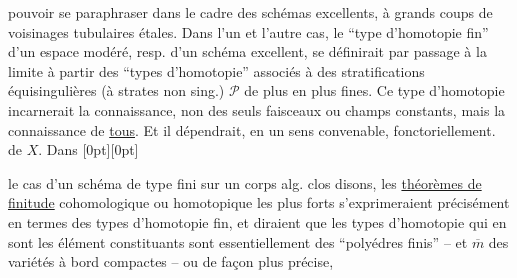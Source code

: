 %
pouvoir se paraphraser dans le cadre des schémas excellents, à grands coups de voisinages tubulaires étales. Dans l'un et l'autre cas, le ``type d'homotopie fin'' d'un espace modéré, resp. d'un schéma excellent, se définirait par passage à la limite à partir des ``types d'homotopie'' associés à des stratifications équisingulières (à strates non sing.) $\mathcal P$ de plus en plus fines. Ce type d'homotopie  incarnerait la connaissance, non des seuls faisceaux ou champs  constants, mais  la connaissance de \uline{tous}. Et il dépendrait, en un sens convenable,
fonctoriellement. de $X$. Dans%
\raisebox{0pt}[0pt][0pt]{\parbox{0pt}{}} le cas d'un schéma de type fini sur un corps alg. clos disons, les \uline{théorèmes de finitude} cohomologique ou homotopique les plus forts s'exprimeraient précisément en termes des types d'homotopie fin, et diraient que les types d'homotopie  qui en sont les élément constituants sont essentiellement des ``polyédres finis'' -- et $\overline m$ des variétés à bord compactes -- ou de façon plus précise,
